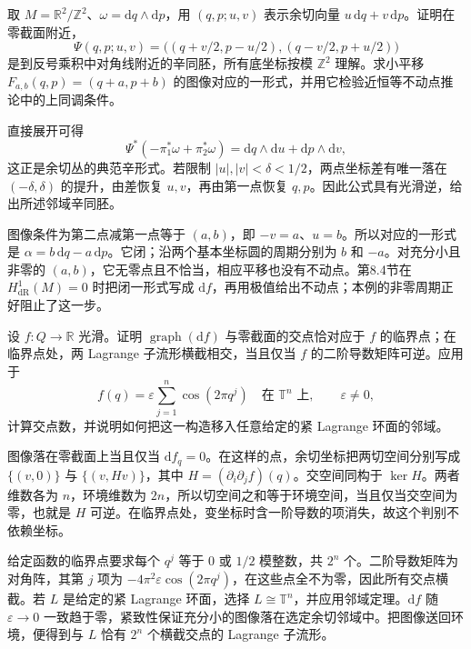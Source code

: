 \begin{exercise}\label{g4:ex:0804:torus-diagonal}
	取 \(M=\mathbb R^2/\mathbb Z^2\)、\(\omega=\mathrm{d}q\wedge\mathrm{d}p\)，用 \((q,p;u,v)\) 表示余切向量 \(u\,\mathrm{d}q+v\,\mathrm{d}p\)。证明在零截面附近，
	\[
		\Psi(q,p;u,v)=\bigl((q+v/2,p-u/2),(q-v/2,p+u/2)\bigr)
	\]
	是到反号乘积中对角线附近的辛同胚，所有底坐标按模 \(\mathbb Z^2\) 理解。求小平移 \(F_{a,b}(q,p)=(q+a,p+b)\) 的图像对应的一形式，并用它检验近恒等不动点推论中的上同调条件。
\end{exercise}
\begin{solution}
	直接展开可得
	\[
		\Psi^*(-\pi_1^*\omega+\pi_2^*\omega)
		=\mathrm{d}q\wedge\mathrm{d}u+\mathrm{d}p\wedge\mathrm{d}v,
	\]
	这正是余切丛的典范辛形式。若限制 \(|u|,|v|<\delta<1/2\)，两点坐标差有唯一落在 \((-\delta,\delta)\) 的提升，由差恢复 \(u,v\)，再由第一点恢复 \(q,p\)。因此公式具有光滑逆，给出所述邻域辛同胚。

	图像条件为第二点减第一点等于 \((a,b)\)，即 \(-v=a\)、\(u=b\)。所以对应的一形式是 \(\alpha=b\,\mathrm{d}q-a\,\mathrm{d}p\)。它闭；沿两个基本坐标圆的周期分别为 \(b\) 和 \(-a\)。对充分小且非零的 \((a,b)\)，它无零点且不恰当，相应平移也没有不动点。第8.4节在 \(H^1_{\mathrm{dR}}(M)=0\) 时把闭一形式写成 \(\mathrm{d}f\)，再用极值给出不动点；本例的非零周期正好阻止了这一步。
\end{solution}

\begin{exercise}\label{g4:ex:0804:transverse-intersections}
	设 \(f:Q\to\mathbb R\) 光滑。证明 \(\operatorname{graph}(\mathrm{d}f)\) 与零截面的交点恰对应于 \(f\) 的临界点；在临界点处，两 Lagrange 子流形横截相交，当且仅当 \(f\) 的二阶导数矩阵可逆。应用于
	\[
		f(q)=\varepsilon\sum_{j=1}^n\cos(2\pi q^j)
		\quad\text{在 }\mathbb T^n\text{ 上},\qquad \varepsilon\ne0,
	\]
	计算交点数，并说明如何把这一构造移入任意给定的紧 Lagrange 环面的邻域。
\end{exercise}
\begin{solution}
	图像落在零截面上当且仅当 \(\mathrm{d}f_q=0\)。在这样的点，余切坐标把两切空间分别写成 \(\{(v,0)\}\) 与 \(\{(v,Hv)\}\)，其中 \(H=(\partial_i\partial_jf)(q)\)。交空间同构于 \(\ker H\)。两者维数各为 \(n\)，环境维数为 \(2n\)，所以切空间之和等于环境空间，当且仅当交空间为零，也就是 \(H\) 可逆。在临界点处，变坐标时含一阶导数的项消失，故这个判别不依赖坐标。

	给定函数的临界点要求每个 \(q^j\) 等于 \(0\) 或 \(1/2\) 模整数，共 \(2^n\) 个。二阶导数矩阵为对角阵，其第 \(j\) 项为 \(-4\pi^2\varepsilon\cos(2\pi q^j)\)，在这些点全不为零，因此所有交点横截。若 \(L\) 是给定的紧 Lagrange 环面，选择 \(L\cong\mathbb T^n\)，并应用邻域定理。\(\mathrm{d}f\) 随 \(\varepsilon\to0\) 一致趋于零，紧致性保证充分小的图像落在选定余切邻域中。把图像送回环境，便得到与 \(L\) 恰有 \(2^n\) 个横截交点的 Lagrange 子流形。
\end{solution}

